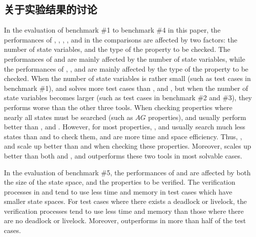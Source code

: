 \subsection{关于实验结果的讨论}
In the evaluation of benchmark \#1 to benchmark \#4 in this paper, the performances of \nusmv{}, \nuxmv{}, \verds{}, , and \sctl{} in the comparisons are affected by two factors: the number of state variables, and the type of the property to be checked. The performances of \nusmv{} and \nuxmv{} are mainly affected by the number of state variables, while the performances of , \verds{}, and \sctl{} are mainly affected by the type of the property to be checked. When the number of state variables is rather small (such as test cases in benchmark \#1), \nusmv{} and \nuxmv{} solves more test cases than , \verds{} and \sctl{}, but when the number of state variables becomes larger (such as test cases in benchmark \#2 and \#3), they performs worse than the other three tools.  When checking properties where nearly all states must be searched (such as $AG$ properties), \nusmv{} and \nuxmv{} usually perform better than , \verds{} and \sctl{}. However, for most properties, , \verds{} and \sctl{} usually search much less states than \nusmv{} and \nuxmv{} to check them, and are more time and space efficiency. Thus, , \verds{} and \sctl{} scale up better than \nusmv{} and \nuxmv{} when checking these properties. Moreover, \sctl{} scales up better than both  and \verds{}, and outperforms these two tools in most solvable cases.


In the evaluation of benchmark \#5, the performances of \sctl{} and \CADP{} are affected by both the size of the state space, and the properties to be verified. 
The verification processes in \sctl{} and \CADP{} tend to use less time and memory in test cases which have smaller state spaces.
For test cases where there exists a deadlock or livelock, the verification processes tend to use less time and memory than those where there are no deadlock or livelock.
Moreover, \sctl{} outperforms \CADP{} in more than half of the test cases.  

